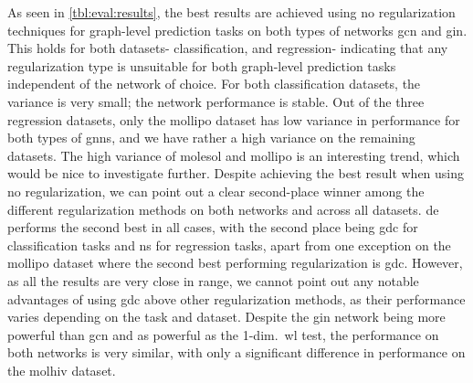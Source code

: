 As seen in \cref{tbl:eval:results}, the best results are achieved using no regularization techniques for graph-level prediction tasks on both types of networks \ac{gcn} and \ac{gin}.
This holds for both datasets- classification, and regression- indicating that any regularization type is unsuitable for both graph-level prediction tasks independent of the network of choice.
For both classification datasets, the variance is very small; the network performance is stable.
Out of the three regression datasets, only the mollipo dataset has low variance in performance for both types of \acp{gnn}, and we have rather a high variance on the remaining datasets.
The high variance of molesol and mollipo is an interesting trend, which would be nice to investigate further.
Despite achieving the best result when using no regularization, we can point out a clear second-place winner among the different regularization methods on both networks and across all datasets.
\Ac{de} performs the second best in all cases, with the second place being \ac{gdc} for classification tasks and \ac{ns} for regression tasks, apart from one exception on the mollipo dataset where the second best performing regularization is \ac{gdc}.
However, as all the results are very close in range, we cannot point out any notable advantages of using \ac{gdc} above other regularization methods, as their performance varies depending on the task and dataset.
Despite the \ac{gin} network being more powerful than \ac{gcn} and as powerful as the 1-dim.\ \ac{wl} test, the performance on both networks is very similar, with only a significant difference in performance on the molhiv dataset.


